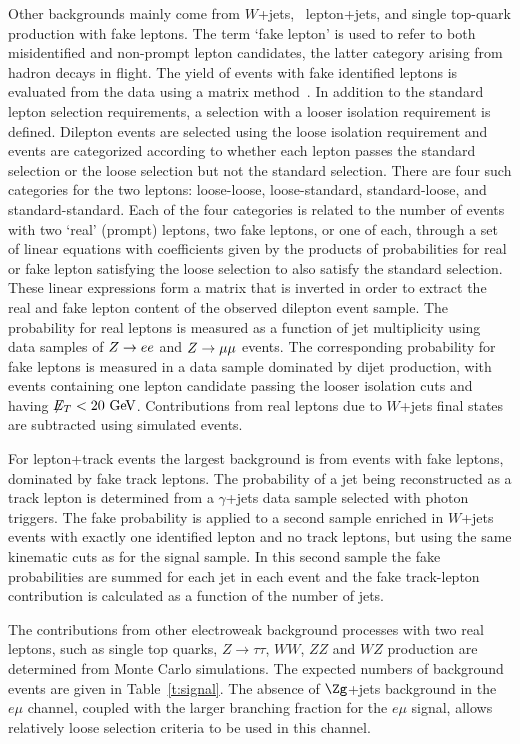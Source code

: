Other backgrounds mainly come from $W$+jets, \ttbar\, lepton+jets,
and single top-quark production with fake leptons. The term `fake
lepton' is used to refer to both misidentified and non-prompt lepton
candidates, the latter category arising from hadron decays in
flight. The yield of events with fake identified leptons is
evaluated from the data using a matrix method~\cite{top2010}. In
addition to the standard lepton selection requirements, a selection
with a looser isolation requirement is defined.  Dilepton events are
selected using the loose isolation requirement and events are
categorized according to whether each lepton passes the standard
selection or the loose selection but not the standard selection.
There are four such categories for the two leptons: loose-loose,
loose-standard, standard-loose, and standard-standard.  Each of the
four categories is related to the number of events with two `real'
(prompt) leptons, two fake leptons, or one of each, through a set of
linear equations with coefficients given by the products of
probabilities for real or fake lepton satisfying the loose selection
to also satisfy the standard selection.  These linear expressions
form a matrix that is inverted in order to extract the real and fake
lepton content of the observed dilepton event sample.
The probability for real leptons is measured as a function of jet
multiplicity using data samples of
$Z \rightarrow ee$ and $Z \rightarrow \mu\mu$ events.
The corresponding probability for
fake leptons is measured in a data sample dominated by dijet production,
with events containing one lepton candidate passing the looser isolation cuts and having $\met <20 \GeV$.
Contributions from real leptons due to $W$+jets final states are
subtracted using simulated events.

For lepton+track events the largest background is from events with
fake leptons, dominated by fake track leptons. The
probability of a jet being reconstructed as a track lepton is
determined from a $\gamma$+jets data sample selected with photon
triggers. The fake probability is applied to a second sample
enriched in $W$+jets events with exactly one identified lepton and
no track leptons, but using the same kinematic cuts as for the
signal sample. In this second sample the fake probabilities are
summed for each jet in each event and the fake track-lepton
contribution is calculated as a function of the number of jets.

The contributions from other electroweak background processes with
two real leptons,  such as single top quarks, $Z \to \tau\tau$,
$WW$, $ZZ$ and $WZ$ production are determined from Monte Carlo
simulations.   The expected numbers of background events are given
in Table~\ref{t:signal}.  The absence of $\Zg$+jets background in
the $e\mu$ channel, coupled with the larger branching fraction for
the $e\mu$ signal, allows relatively loose selection criteria to be
used in this channel. %

